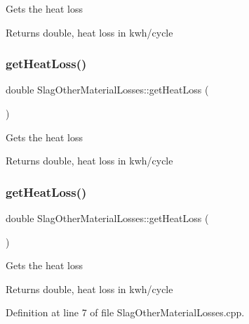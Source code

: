 Gets the heat loss

\begin{DoxyReturn}{Returns}
double, heat loss in kwh/cycle 
\end{DoxyReturn}
\mbox{\label{class_slag_other_material_losses_a4c96a826ef6da38f4c27f7efd8b4a7ba}} 
\subsubsection{\texorpdfstring{get\+Heat\+Loss()}{getHeatLoss()}\hspace{0.1cm}{\footnotesize\ttfamily [2/3]}}
{\footnotesize\ttfamily double Slag\+Other\+Material\+Losses\+::get\+Heat\+Loss (\begin{DoxyParamCaption}{ }\end{DoxyParamCaption})}

Gets the heat loss

\begin{DoxyReturn}{Returns}
double, heat loss in kwh/cycle 
\end{DoxyReturn}
\mbox{\label{class_slag_other_material_losses_a4c96a826ef6da38f4c27f7efd8b4a7ba}} 
\subsubsection{\texorpdfstring{get\+Heat\+Loss()}{getHeatLoss()}\hspace{0.1cm}{\footnotesize\ttfamily [3/3]}}
{\footnotesize\ttfamily double Slag\+Other\+Material\+Losses\+::get\+Heat\+Loss (\begin{DoxyParamCaption}{ }\end{DoxyParamCaption})}

Gets the heat loss

\begin{DoxyReturn}{Returns}
double, heat loss in kwh/cycle 
\end{DoxyReturn}


Definition at line 7 of file Slag\+Other\+Material\+Losses.\+cpp.

